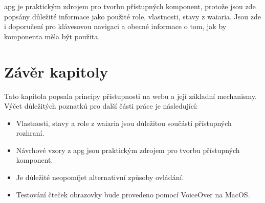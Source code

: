\gls{apg} je praktickým zdrojem pro tvorbu přístupných komponent, protože jsou zde popsány důležité informace jako použité role, vlastnosti, stavy z \gls{waiaria}.
Jsou zde i doporučení pro klávesovou navigaci a obecné informace o tom, jak by komponenta měla být použita.

\section{Závěr kapitoly}

Tato kapitola popsala principy přístupnosti na webu a její základní mechanismy.
Výčet důležitých poznatků pro další části práce je následující:

\begin{itemize}
  \item Vlastnosti, stavy a role z \gls{waiaria} jsou důležitou součástí přístupných rozhraní.
  \item Návrhové vzory z \gls{apg} jsou praktickým zdrojem pro tvorbu přístupných komponent.
  \item Je důležité neopomíjet alternativní způsoby ovládání.
  \item Testování čteček obrazovky bude provedeno pomocí VoiceOver na MacOS.
\end{itemize}
